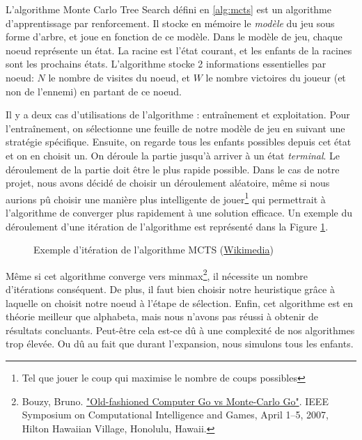L'algorithme Monte Carlo Tree Search défini en \ref{alg:mcts} est un algorithme d'apprentissage par renforcement.
Il stocke en mémoire le \emph{modèle} du jeu sous forme d'arbre, et joue en fonction de ce modèle.
Dans le modèle de jeu, chaque noeud représente un état. La racine est l'état courant, et les enfants de la racines
sont les prochains états. L'algorithme stocke 2 informations essentielles par noeud: $N$ le nombre de visites du noeud, et $W$
le nombre victoires du joueur (et non de l'ennemi) en partant de ce noeud.

Il y a deux cas d'utilisations de l'algorithme : entraînement et exploitation.
Pour l'entraînement, on sélectionne une feuille de notre modèle de jeu en suivant une stratégie spécifique.
Ensuite, on regarde tous les enfants possibles depuis cet état et on en choisit un. On déroule
la partie jusqu'à arriver à un état \emph{terminal}. Le déroulement de la partie doit être le plus rapide possible.
Dans le cas de notre projet, nous avons décidé de choisir un déroulement aléatoire, même si nous aurions pû choisir une manière plus intelligente de jouer\footnote{Tel que jouer le coup qui maximise le nombre de coups possibles} qui permettrait
à l'algorithme de converger plus rapidement à une solution efficace.
Un exemple du déroulement d'une itération de l'algorithme est représenté dans la Figure \ref{fig:mcts-exemple}.
\begin{figure}[H]
	\centering
	\caption{Exemple d'itération de l'algorithme MCTS (\href{https://commons.wikimedia.org/wiki/File:MCTS_(French).svg}{Wikimedia})}
	\label{fig:mcts-exemple}
\end{figure}

Même si cet algorithme converge vers minmax\footnote{Bouzy, Bruno. \href{https://ewh.ieee.org/cmte/cis/mtsc/ieeecis/tutorial2007/Bruno_Bouzy_2007.pdf}{"Old-fashioned Computer Go vs Monte-Carlo Go"}. IEEE Symposium on Computational Intelligence and Games, April 1–5, 2007, Hilton Hawaiian Village, Honolulu, Hawaii.},
il nécessite un nombre d'itérations conséquent. De plus, il faut bien choisir notre heuristique grâce à laquelle on choisit notre noeud à l'étape de sélection.
Enfin, cet algorithme est en théorie meilleur que alphabeta, mais nous n'avons pas réussi à obtenir de résultats concluants.
Peut-être cela est-ce dû à une complexité de nos algorithmes trop élevée. Ou dû au fait que durant l'expansion, nous
simulons tous les enfants. 

